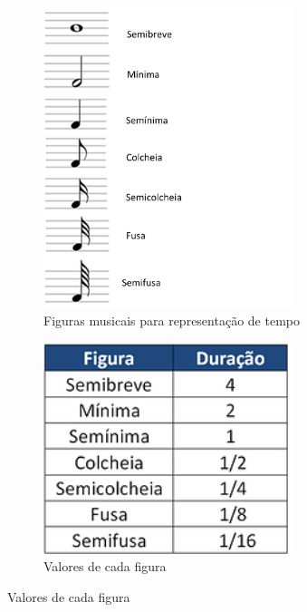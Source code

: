 \documentclass[12pt]{report}
\begin{document}
{\begin{figure}[H]
  \centering
  \begin{subfigure}{0.4\textwidth}
    \centering
    \includegraphics[width=0.8\textwidth]{imagens/tempos.png}
    \caption{Figuras musicais para representação de tempo}
    \label{fig:tempos}
  \end{subfigure}
  \begin{subfigure}{0.4\textwidth}
    \centering
    \includegraphics[width=0.8\textwidth]{imagens/semibreve.png}
    \caption{Valores de cada figura}
    \label{fig:tempos_valores}
  \end{subfigure}
\end{figure}

}
\end{document}
